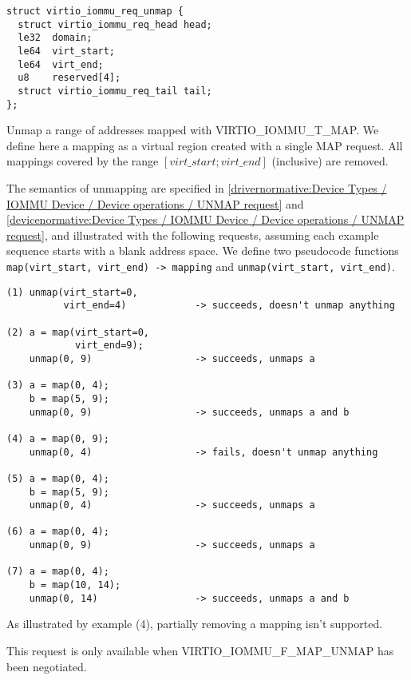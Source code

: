 \begin{lstlisting}
struct virtio_iommu_req_unmap {
  struct virtio_iommu_req_head head;
  le32  domain;
  le64  virt_start;
  le64  virt_end;
  u8    reserved[4];
  struct virtio_iommu_req_tail tail;
};
\end{lstlisting}

Unmap a range of addresses mapped with VIRTIO_IOMMU_T_MAP. We define here
a mapping as a virtual region created with a single MAP request. All
mappings covered by the range $[virt\_start; virt\_end]$ (inclusive) are
removed.

The semantics of unmapping are specified in \ref{drivernormative:Device
Types / IOMMU Device / Device operations / UNMAP request} and
\ref{devicenormative:Device Types / IOMMU Device / Device operations /
UNMAP request}, and illustrated with the following requests, assuming each
example sequence starts with a blank address space. We define two
pseudocode functions \texttt{map(virt_start, virt_end) -> mapping} and
\texttt{unmap(virt_start, virt_end)}.

\begin{lstlisting}
(1) unmap(virt_start=0,
          virt_end=4)            -> succeeds, doesn't unmap anything

(2) a = map(virt_start=0,
            virt_end=9);
    unmap(0, 9)                  -> succeeds, unmaps a

(3) a = map(0, 4);
    b = map(5, 9);
    unmap(0, 9)                  -> succeeds, unmaps a and b

(4) a = map(0, 9);
    unmap(0, 4)                  -> fails, doesn't unmap anything

(5) a = map(0, 4);
    b = map(5, 9);
    unmap(0, 4)                  -> succeeds, unmaps a

(6) a = map(0, 4);
    unmap(0, 9)                  -> succeeds, unmaps a

(7) a = map(0, 4);
    b = map(10, 14);
    unmap(0, 14)                 -> succeeds, unmaps a and b
\end{lstlisting}

As illustrated by example (4), partially removing a mapping isn't
supported.

This request is only available when VIRTIO_IOMMU_F_MAP_UNMAP has been
negotiated.


